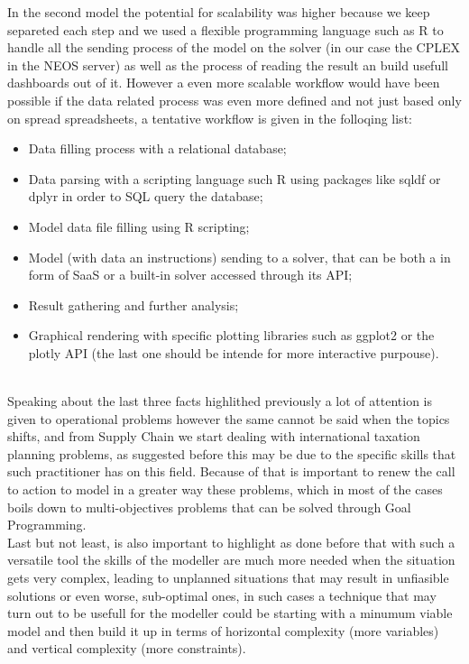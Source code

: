 \begin{doublespace}
In the second model the potential for scalability was higher because we keep separeted each step and we used a flexible programming language such as R to handle all the sending process of the model on the solver (in our case the CPLEX in the NEOS server) as well as the process of reading the result an build usefull dashboards out of it. 
However a even more scalable workflow would have been possible if the data related process was even more defined and not just based only on spread spreadsheets, a tentative workflow is given in the folloqing list:
\begin{itemize}
	\item Data filling process with a relational database;
	\item Data parsing with a scripting language such R using packages like sqldf or dplyr in order to SQL query the database;
	\item Model data file filling using R scripting;
	\item Model (with data an instructions) sending to a solver, that can be both a in form of SaaS or a built-in solver accessed through its API;
	\item Result gathering and further analysis; 
	\item Graphical rendering with specific plotting libraries such as ggplot2 or the plotly API (the last one should be intende for more interactive purpouse).
\end{itemize}
\\
Speaking about the last three facts highlithed previously a lot of attention is given to operational problems however the same cannot be said when the topics shifts, and from Supply Chain we start dealing with international taxation planning problems, as suggested before this may be due to the specific skills that such practitioner has on this field. Because of that is important to renew the call to action to model in a greater way these problems, which in most of the cases boils down to multi-objectives problems that can be solved through Goal Programming.
\\
Last but not least, is also important to highlight as done before that with such a versatile tool the skills of the modeller are much more needed when the situation gets very complex, leading to unplanned situations that may result in unfiasible solutions or even worse, sub-optimal ones, in such cases a technique that may turn out to be usefull for the modeller could be starting with a minumum viable model and then build it up in terms of horizontal complexity (more variables) and vertical complexity (more constraints).


\end{doublespace}
